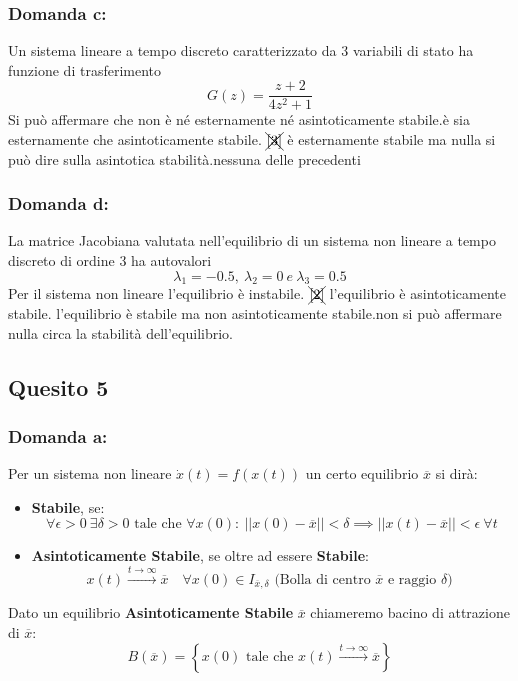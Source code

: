 \documentclass[a4paper]{report}
\begin{document}
\subsubsection*{Domanda c:}
Un sistema lineare a tempo discreto caratterizzato da 3 variabili di stato ha funzione di trasferimento
\[
G(z)=\frac{z+2}{4z^2+1}
\]
Si può affermare che
\bigskip \newline
[1] non è né esternamente né asintoticamente stabile.\newline
[2]è sia esternamente che asintoticamente stabile.\newline
$\xcancel{[3]}$ è esternamente stabile ma nulla si può dire sulla asintotica stabilità.\newline
[4] nessuna delle precedenti
\subsubsection*{Domanda d:}
La matrice Jacobiana valutata nell’equilibrio di un sistema non lineare a tempo discreto di ordine 3 ha autovalori
\[
\lambda_1 = - 0.5,\: \lambda_2 = 0 \:e \:\lambda_3 = 0.5
\]
Per il sistema non lineare
\bigskip \newline
[1] l’equilibrio è instabile.\newline
$\xcancel{[2]}$ l’equilibrio è asintoticamente stabile. \newline
[3] l’equilibrio è stabile ma non asintoticamente stabile.\newline
[4] non si può affermare nulla circa la stabilità dell’equilibrio.
\newpage
\subsection*{Quesito 5}
\subsubsection*{Domanda a:}
Per un sistema non lineare $\dot{x}(t)=f(x(t))$ un certo equilibrio $\overline{x}$ si dirà:
\begin{itemize}
\item \textbf{Stabile}, se:
\[
\forall \epsilon>0 \: \exists \delta >0 \text{ tale che } \forall x(0): \: ||x(0)-\overline{x}||<\delta\implies ||x(t)-\overline{x}||<\epsilon \: \forall t
\]
\item \textbf{Asintoticamente Stabile}, se oltre ad essere \textbf{Stabile}: 
\[
x(t)\overset{t\to \infty}{\longrightarrow}\overline{x} \quad \forall x(0)\in I_{\overline{x},\delta} \text{ (Bolla di centro $\overline{x}$ e raggio $\delta$) }
\]
\end{itemize}
Dato un equilibrio \textbf{Asintoticamente Stabile} $\overline{x}$ chiameremo bacino di attrazione di $\overline{x}$:
\[
B(\overline{x})=\left\{x(0) \text{ tale che }x(t)\overset{t\to \infty}{\longrightarrow}\overline{x}\right\}
\]
\end{document}

